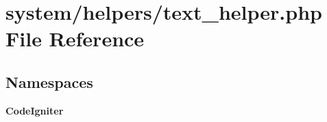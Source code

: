 \section{system/helpers/text\-\_\-helper.php File Reference}
\label{text__helper_8php}
\subsection*{Namespaces}
\begin{DoxyCompactItemize}
\item 
{\bf Code\-Igniter}
\end{DoxyCompactItemize}
